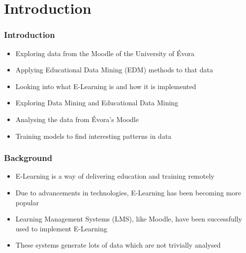 \section{Introduction}

\begin{frame}
\frametitle{Introduction}


\vspace{0.5cm}

\begin{itemize}
    \item Exploring data from the Moodle of the University of Évora
    \item Applying Educational Data Mining (EDM) methods to that data
\end{itemize}


\vspace{0.5cm}

\begin{itemize}
    \item Looking into what E-Learning is and how it is implemented
    \item Exploring Data Mining and Educational Data Mining
    \item Analysing the data from Évora's Moodle
    \item Training models to find interesting patterns in data
\end{itemize}

\end{frame}

\begin{frame}
\frametitle{Background}


\begin{itemize}
    \item E-Learning is a way of delivering education and training remotely
    \item Due to advancements in technologies, E-Learning has been becoming more popular
    \item Learning Management Systems (LMS), like Moodle, have been successfully used to implement E-Learning
    \item These systems generate lots of data which are not trivially analysed
\end{itemize}

\end{frame}

